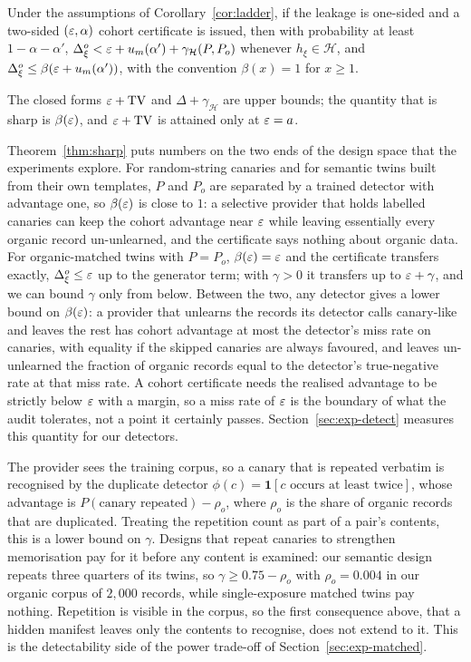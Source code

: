 \begin{corollary}\label{cor:ladder1}
Under the assumptions of Corollary~\ref{cor:ladder}, if the leakage is one-sided and a
two-sided $(\varepsilon,\alpha)$ cohort certificate is issued, then with probability at least
$1-\alpha-\alpha'$, $\Delta^o_\xi<\varepsilon+u_m(\alpha')+\gamma_{\mathcal H}(P,P_o)$ whenever
$h_\xi\in\mathcal H$, and $\Delta^o_\xi\le\beta(\varepsilon+u_m(\alpha'))$, with the convention
$\beta(x)=1$ for $x\ge1$.
\end{corollary}

The closed forms $\varepsilon+\mathrm{TV}$ and $\Delta+\gamma_{\mathcal H}$ are upper bounds; the
quantity that is sharp is $\beta(\varepsilon)$, and $\varepsilon+\mathrm{TV}$ is attained only at
$\varepsilon=a$.

Theorem~\ref{thm:sharp} puts numbers on the two ends of the design space that the
experiments explore. For random-string canaries and for semantic twins built from their
own templates, $P$ and $P_o$ are separated by a trained detector with advantage one, so
$\beta(\varepsilon)$ is close to $1$: a selective provider that holds labelled canaries can keep
the cohort advantage near $\varepsilon$ while leaving essentially every organic record
un-unlearned, and the certificate says nothing about organic data. For organic-matched
twins with $P=P_o$, $\beta(\varepsilon)=\varepsilon$ and the certificate transfers exactly,
$\Delta^o_\xi\le\varepsilon$ up to the generator term; with $\gamma>0$ it transfers up to
$\varepsilon+\gamma$, and we can bound $\gamma$ only from below. Between the two, any detector
gives a lower bound on $\beta(\varepsilon)$: a provider that unlearns the records its detector
calls canary-like and leaves the rest has cohort advantage at most the detector's miss rate
on canaries, with equality if the skipped canaries are always favoured, and leaves
un-unlearned the fraction of organic records equal to the detector's true-negative rate at
that miss rate. A cohort certificate needs the realised advantage to be strictly below
$\varepsilon$ with a margin, so a miss rate of $\varepsilon$ is the boundary of what the audit tolerates,
not a point it certainly passes.
Section~\ref{sec:exp-detect} measures this quantity for our detectors.

\begin{remark}
The provider sees the training corpus, so a canary that is repeated verbatim is recognised
by the duplicate detector $\phi(c)=\mathbf 1[\text{$c$ occurs at least twice}]$, whose
advantage is $P(\text{canary repeated})-\rho_o$, where $\rho_o$ is the share of organic
records that are duplicated. Treating the repetition count as part of a pair's contents,
this is a lower bound on $\gamma$. Designs that repeat canaries to strengthen memorisation
pay for it before any content is examined: our semantic design repeats three quarters of
its twins, so $\gamma\ge0.75-\rho_o$ with $\rho_o=0.004$ in our organic corpus of $2{,}000$ records,
while single-exposure matched twins pay nothing. Repetition is visible in the corpus, so
the first consequence above, that a hidden manifest leaves only the contents to recognise,
does not extend to it. This is the detectability side of the power
trade-off of Section~\ref{sec:exp-matched}.
\end{remark}

